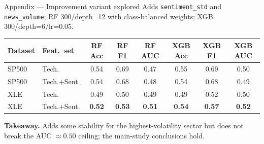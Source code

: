 \documentclass[aspectratio=169,11pt]{beamer}
\begin{document}
\begin{frame}{Appendix --- Improvement variant explored}
\footnotesize Adds \texttt{sentiment\_std} and \texttt{news\_volume}; RF 300/depth=12 with class-balanced weights; XGB 300/depth=6/lr=0.05.

\vspace{4pt}
\begin{center}
\renewcommand{\arraystretch}{1.15}
\setlength{\tabcolsep}{5pt}
\footnotesize
\begin{tabular}{@{}l l c c c c c c@{}}
\toprule
\textbf{Dataset} & \textbf{Feat.\ set} & \textbf{RF Acc} & \textbf{RF F1} & \textbf{RF AUC} & \textbf{XGB Acc} & \textbf{XGB F1} & \textbf{XGB AUC} \\
\midrule
SP500 & Tech.        & 0.54 & 0.69 & 0.47 & 0.55 & 0.69 & 0.50 \\
SP500 & Tech.+Sent.  & 0.54 & 0.68 & 0.48 & 0.54 & 0.68 & 0.49 \\
XLE   & Tech.        & 0.49 & 0.50 & 0.49 & 0.49 & 0.52 & 0.50 \\
XLE   & Tech.+Sent.  & \textbf{0.52} & \textbf{0.53} & \textbf{0.51} & \textbf{0.54} & \textbf{0.57} & \textbf{0.52} \\
\bottomrule
\end{tabular}
\end{center}

\vspace{4pt}
\footnotesize\textbf{Takeaway.} Adds some stability for the highest-volatility sector but does not break the AUC $\approx 0.50$ ceiling; the main-study conclusions hold.
\end{frame}
\end{document}
